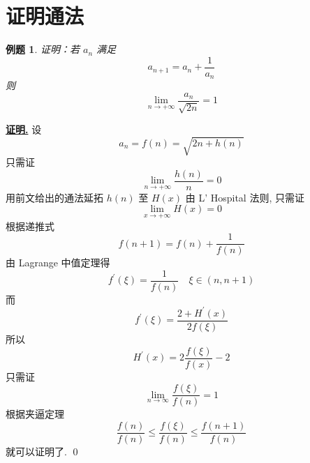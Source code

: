 \documentclass[10pt,a4paper]{book}
\theoremstyle{thmstyle} %
\theoremstyle{defstyle} %
\theoremstyle{prostyle} %
\newtheorem{example}{例题}[chapter]
\renewenvironment{proof}[1][证明]{\par{\kaishu \uline{\textbf{#1.}}} \;\fangsong}{\qed\par}
\begin{document}
	\section{证明通法\textsuperscript{\cite{QLN2021}}}
	\begin{example}
		证明：若 ${a_n}$ 满足$$a_{n+1}=a_n+\frac{1}{a_n}$$ 则$$\lim\limits_{n\rightarrow+\infty}\frac{a_n}{\sqrt{2n}}=1$$
	\end{example}
	\begin{proof}
		设$$a_n=f\left( n \right) =\sqrt{2n+h\left( n \right)}$$只需证$$\lim\limits _{n\rightarrow +\infty}\frac{h\left( n \right)}{n}=0$$用前文给出的通法延拓 $h\left( n \right)$ 至 $H\left( x \right)$ 由 L' Hospital 法则, 只需证$$\lim\limits_{x\rightarrow +\infty} H\left( x \right) =0$$根据递推式
		$$
		f\left( n+1 \right) =f\left( n \right) +\frac{1}{f\left( n \right)}
		$$
		由 Lagrange 中值定理得
		$$
		f^{\prime}\left( \xi \right) =\frac{1}{f\left( n \right)}\quad\xi \in \left( n,n+1 \right) 
		$$
		而
		$$
		f^{\prime}\left( \xi \right) =\frac{2+H^\prime\left( x \right)}{2f\left( \xi \right)}
		$$
		所以
		$$
		H^{\prime}\left( x \right) =2\frac{f\left( \xi \right)}{f\left( x \right)}-2
		$$
		只需证
		$$
		\lim\limits_{n\rightarrow\infty}\frac{f(\xi)}{f(n)}=1
		$$	
		根据夹逼定理
		$$
		\frac{f\left( n \right)}{f\left( n \right)}\leqslant \frac{f(\xi )}{f(n)}\leqslant \frac{f\left( n+1 \right)}{f\left( n \right)}
		$$
		就可以证明了.
	\end{proof}
\end{document}
